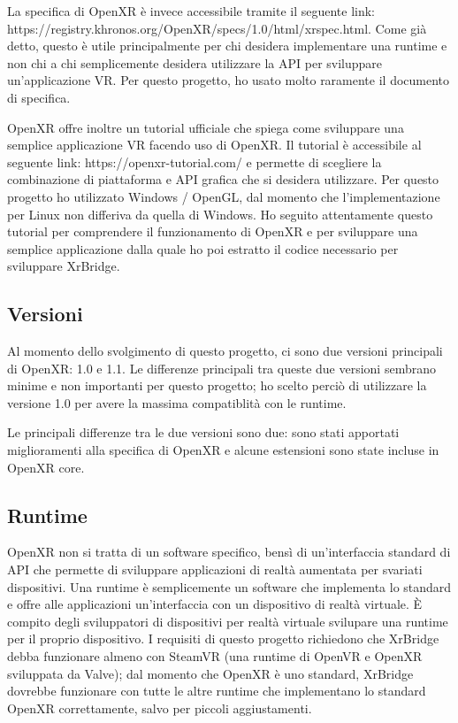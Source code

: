 \documentclass[twoside]{supsistudent}
\begin{document}
La specifica di OpenXR è invece accessibile tramite il seguente link: https://registry.khronos.org/OpenXR/specs/1.0/html/xrspec.html. Come già detto, questo è utile principalmente per chi desidera implementare una runtime e non chi a chi semplicemente desidera utilizzare la API per sviluppare un'applicazione VR. Per questo progetto, ho usato molto raramente il documento di specifica.

OpenXR offre inoltre un tutorial ufficiale che spiega come sviluppare una semplice applicazione VR facendo uso di OpenXR. Il tutorial è accessibile al seguente link: https://openxr-tutorial.com/ e permette di scegliere la combinazione di piattaforma e API grafica che si desidera utilizzare. Per questo progetto ho utilizzato Windows / OpenGL, dal momento che l'implementazione per Linux non differiva da quella di Windows. Ho seguito attentamente questo tutorial per comprendere il funzionamento di OpenXR e per sviluppare una semplice applicazione dalla quale ho poi estratto il codice necessario per sviluppare XrBridge.

\subsection{Versioni}

Al momento dello svolgimento di questo progetto, ci sono due versioni principali di OpenXR: 1.0 e 1.1. Le differenze principali tra queste due versioni sembrano minime e non importanti per questo progetto; ho scelto perciò di utilizzare la versione 1.0 per avere la massima compatiblità con le runtime.

Le principali differenze tra le due versioni sono due: sono stati apportati miglioramenti alla specifica di OpenXR e alcune estensioni sono state incluse in OpenXR core.

\subsection{Runtime}

OpenXR non si tratta di un software specifico, bensì di un'interfaccia standard di API che permette di sviluppare applicazioni di realtà aumentata per svariati dispositivi. Una runtime è semplicemente un software che implementa lo standard e offre alle applicazioni un'interfaccia con un dispositivo di realtà virtuale. È compito degli sviluppatori di dispositivi per realtà virtuale svilupare una runtime per il proprio dispositivo. I requisiti di questo progetto richiedono che XrBridge debba funzionare almeno con SteamVR (una runtime di OpenVR e OpenXR sviluppata da Valve); dal momento che OpenXR è uno standard, XrBridge dovrebbe funzionare con tutte le altre runtime che implementano lo standard OpenXR correttamente, salvo per piccoli aggiustamenti.
\end{document}
